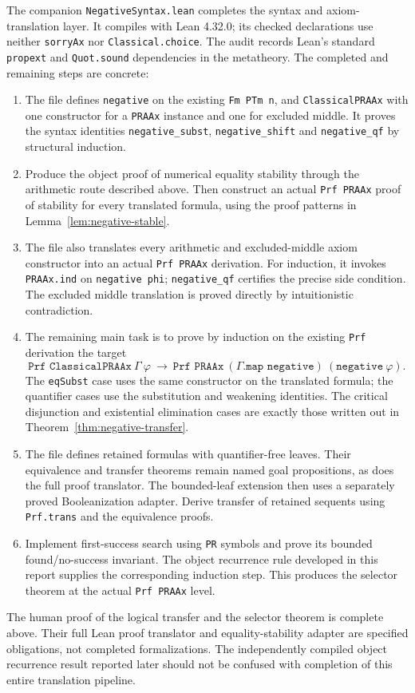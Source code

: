 The companion \texttt{NegativeSyntax.lean} completes the syntax and
axiom-translation layer. It compiles with Lean 4.32.0; its checked declarations
use neither \texttt{sorryAx} nor \texttt{Classical.choice}. The audit records
Lean's standard \texttt{propext} and \texttt{Quot.sound} dependencies in the
metatheory. The completed and remaining steps are concrete:
\begin{enumerate}
\item The file defines \texttt{negative} on the existing \texttt{Fm PTm n},
  and \texttt{ClassicalPRAAx} with one constructor for a \texttt{PRAAx}
  instance and one for excluded middle. It proves the syntax identities
  \texttt{negative\_subst}, \texttt{negative\_shift} and
  \texttt{negative\_qf} by structural induction.
\item Produce the object proof of numerical equality stability through the
  arithmetic route described above. Then construct an actual
  \texttt{Prf PRAAx} proof of stability for every translated formula, using
  the proof patterns in Lemma~\ref{lem:negative-stable}.
\item The file also translates every arithmetic and excluded-middle axiom
  constructor into an actual \texttt{Prf PRAAx} derivation. For induction,
  it invokes \texttt{PRAAx.ind} on \texttt{negative phi};
  \texttt{negative\_qf} certifies the precise side condition. The excluded
  middle translation is proved directly by intuitionistic contradiction.
\item The remaining main task is to prove by induction on the existing
  \texttt{Prf} derivation the target
\[
 \texttt{Prf ClassicalPRAAx}\ \Gamma\ \varphi
 \ \longrightarrow\
 \texttt{Prf PRAAx}\ (\Gamma\texttt{.map negative})\
       (\texttt{negative}\ \varphi).
\]
  The \texttt{eqSubst} case uses the same constructor on the translated
  formula; the quantifier cases use the substitution and weakening
  identities. The critical disjunction and existential elimination cases
  are exactly those written out in Theorem~\ref{thm:negative-transfer}.
\item The file defines retained formulas with quantifier-free leaves.
  Their equivalence and transfer theorems remain named goal propositions,
  as does the full proof translator. The bounded-leaf extension then uses a
  separately proved Booleanization adapter. Derive transfer of retained
  sequents using
  \texttt{Prf.trans} and the equivalence proofs.
\item Implement first-success search using \texttt{PR} symbols and prove its
  bounded found/no-success invariant. The object recurrence rule developed
  in this report supplies the corresponding induction step. This produces
  the selector theorem at the actual \texttt{Prf PRAAx} level.
\end{enumerate}

The human proof of the logical transfer and the selector theorem is complete
above. Their full Lean proof translator and equality-stability adapter are
specified obligations, not completed formalizations. The independently
compiled object recurrence result reported later should not be confused
with completion of this entire translation pipeline.
